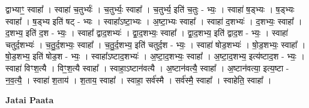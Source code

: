 \documentclass[17pt]{extarticle}
\begin{document}
द्वाभ्याꣳ॒॒ स्वाहा᳚ । स्वाहा॑ च॒तुर्भ्यः॑ । च॒तुर्भ्यः॒ स्वाहा᳚ । च॒तुर्भ्य॒ इति॑ च॒तुः - भ्यः॒ । स्वाहा॑ ष॒ड्भ्यः । ष॒ड्भ्यः स्वाहा᳚ । ष॒ड्भ्य इति॑ षट् - भ्यः । स्वाहा᳚ऽष्टा॒भ्यः । अ॒ष्टा॒भ्यः स्वाहा᳚ । स्वाहा॑ द॒शभ्यः॑ । द॒शभ्यः॒ स्वाहा᳚ । द॒शभ्य॒ इति॑ द॒श - भ्यः॒ । स्वाहा᳚ द्वाद॒शभ्यः॑ । द्वा॒द॒शभ्यः॒ स्वाहा᳚ । द्वा॒द॒शभ्य॒ इति॑ द्वाद॒श - भ्यः॒ । स्वाहा॑ चतुर्द॒शभ्यः॑ । च॒तु॒र्द॒शभ्यः॒ स्वाहा᳚ । च॒तु॒र्द॒शभ्य॒ इति॑ चतुर्द॒श - भ्यः॒ । स्वाहा॑ षोड॒शभ्यः॑ । षो॒ड॒शभ्यः॒ स्वाहा᳚ । षो॒ड॒शभ्य॒ इति॑ षोड॒श - भ्यः॒ । स्वाहा᳚ऽष्टाद॒शभ्यः॑ । अ॒ष्टा॒द॒शभ्यः॒ स्वाहा᳚ । अ॒ष्टा॒द॒शभ्य॒ इत्य॑ष्टाद॒श - भ्यः॒ । स्वाहा॑ विꣳश॒त्यै । विꣳ॒॒श॒त्यै स्वाहा᳚ । स्वाहा॒ऽष्टान॑वत्यै । अ॒ष्टान॑वत्यै॒ स्वाहा᳚ । अ॒ष्टान॑वत्या॒ इत्य॒ष्टा - न॒व॒त्यै॒ । स्वाहा॑ श॒ताय॑ । श॒ताय॒ स्वाहा᳚ । स्वाहा॒ सर्व॑स्मै । सर्व॑स्मै॒ स्वाहा᳚ । स्वाहेति॒ स्वाहा᳚ । \newline

\textbf{Jatai Paata} \newline
\end{document}
